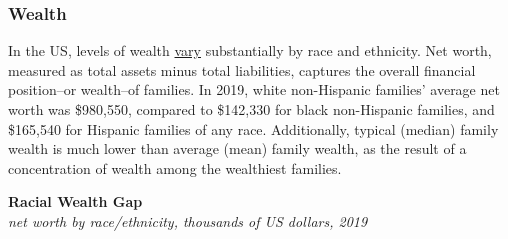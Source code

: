 \documentclass{report}
\begin{document}
{\begin{minipage}{0.76\textwidth}   
\subsubsection*{Wealth}
\small In the US, levels of wealth \href{https://www.federalreserve.gov/econres/notes/feds-notes/disparities-in-wealth-by-race-and-ethnicity-in-the-2019-survey-of-consumer-finances-20200928.htm}{vary} substantially by race and ethnicity. Net worth, measured as total assets minus total liabilities, captures the overall financial position--or wealth--of families. In 2019, white non-Hispanic families' average net worth was \$980,550, compared to \$142,330 for black non-Hispanic families, and \$165,540 for Hispanic families of any race. Additionally, typical (median) family wealth is much lower than average (mean) family wealth, as the result of a concentration of wealth among the wealthiest families.

\normalsize \textbf{Racial Wealth Gap}\\
\footnotesize{\textit{net worth by race/ethnicity, thousands of US dollars, 2019}}


\end{minipage}}
\end{document}
